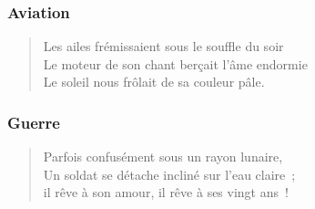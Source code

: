 {\selectfont 

  \subsubsection*{Aviation}

  \begin{verse}
    Les ailes frémissaient sous le souffle du soir \\
	  Le moteur de son chant berçait l'âme endormie \\
	  Le soleil nous frôlait de sa couleur pâle.
  \end{verse}
  
  \subsubsection*{Guerre}
  
  \begin{verse}
	  Parfois confusément sous un rayon lunaire,\\
	  Un soldat se détache incliné sur l'eau claire ; \\
	  il rêve à son amour, il rêve à ses vingt ans !
  \end{verse}
}

\newpage 

